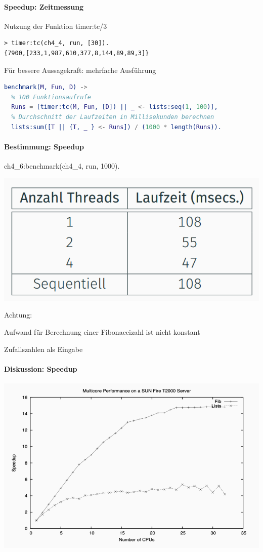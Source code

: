 \documentclass[10pt]{article}
\begin{document}
\paragraph{Speedup: Zeitmessung}

Nutzung der Funktion timer:tc/3
\begin{lstlisting}
> timer:tc(ch4_4, run, [30]).
{7900,[233,1,987,610,377,8,144,89,89,3]}
\end{lstlisting}
Für bessere Aussagekraft: mehrfache Ausführung
\begin{lstlisting}[language=erlang]
benchmark(M, Fun, D) ->
  % 100 Funktionsaufrufe
  Runs = [timer:tc(M, Fun, [D]) || _ <- lists:seq(1, 100)],
  % Durchschnitt der Laufzeiten in Millisekunden berechnen
  lists:sum([T || {T, _ } <- Runs]) / (1000 * length(Runs)).
\end{lstlisting}

\paragraph{Bestimmung: Speedup}

ch4\_6:benchmark(ch4\_4, run, 1000).
\begin{center}
  \includegraphics[width=0.4\linewidth]{Assets/Programmierparadigmen-Speedup-Bestimmung}
\end{center}
\color{orange} Achtung: \color{black}
\begin{itemize*}
  \item Aufwand für Berechnung einer Fibonaccizahl ist nicht konstant
  \item Zufallszahlen als Eingabe
\end{itemize*}

\paragraph{Diskussion: Speedup}

\begin{center}
  \includegraphics[width=0.4\linewidth]{Assets/Programmierparadigmen-Speedup-Diskussion}
\end{center}
\end{document}
